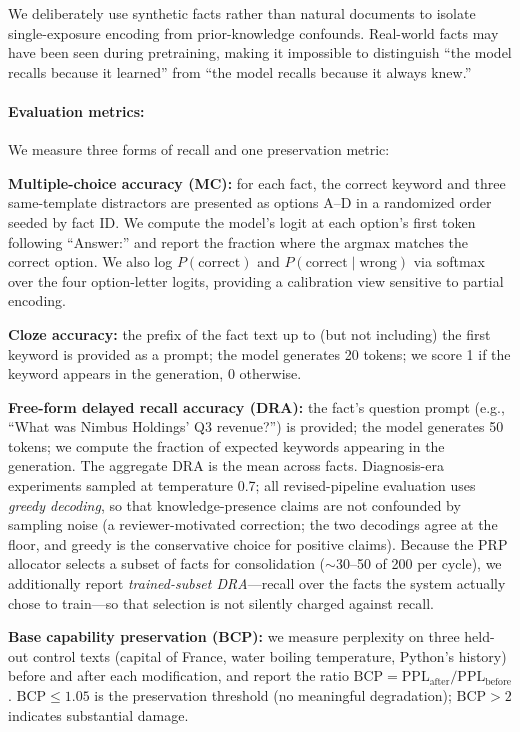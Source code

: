 We deliberately use synthetic facts rather than natural documents to isolate single-exposure encoding from prior-knowledge confounds. Real-world facts may have been seen during pretraining, making it impossible to distinguish ``the model recalls because it learned'' from ``the model recalls because it always knew.''

\paragraph{Evaluation metrics:}
We measure three forms of recall and one preservation metric:

\textbf{Multiple-choice accuracy (MC):} for each fact, the correct keyword and three same-template distractors are presented as options A--D in a randomized order seeded by fact ID. We compute the model's logit at each option's first token following ``Answer:'' and report the fraction where the argmax matches the correct option. We also log $P(\mathrm{correct})$ and $P(\mathrm{correct} \mid \mathrm{wrong})$ via softmax over the four option-letter logits, providing a calibration view sensitive to partial encoding.

\textbf{Cloze accuracy:} the prefix of the fact text up to (but not including) the first keyword is provided as a prompt; the model generates 20 tokens; we score 1 if the keyword appears in the generation, 0 otherwise.

\textbf{Free-form delayed recall accuracy (DRA):} the fact's question prompt (e.g., ``What was Nimbus Holdings' Q3 revenue?'') is provided; the model generates 50 tokens; we compute the fraction of expected keywords appearing in the generation. The aggregate DRA is the mean across facts. Diagnosis-era experiments sampled at temperature 0.7; all revised-pipeline evaluation uses \emph{greedy decoding}, so that knowledge-presence claims are not confounded by sampling noise (a reviewer-motivated correction; the two decodings agree at the floor, and greedy is the conservative choice for positive claims). Because the PRP allocator selects a subset of facts for consolidation ($\sim$30--50 of 200 per cycle), we additionally report \emph{trained-subset DRA}---recall over the facts the system actually chose to train---so that selection is not silently charged against recall.

\textbf{Base capability preservation (BCP):} we measure perplexity on three held-out control texts (capital of France, water boiling temperature, Python's history) before and after each modification, and report the ratio $\mathrm{BCP} = \mathrm{PPL}_{\mathrm{after}} / \mathrm{PPL}_{\mathrm{before}}$. $\mathrm{BCP} \leq 1.05$ is the preservation threshold (no meaningful degradation); $\mathrm{BCP} > 2$ indicates substantial damage.


